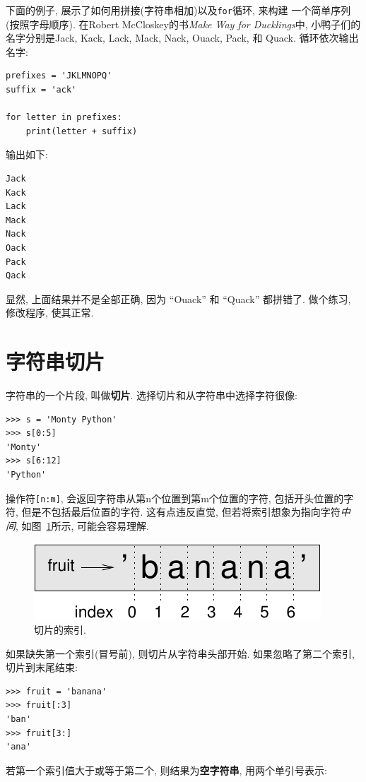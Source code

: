 \documentclass[10pt]{book}
\begin{document}
下面的例子, 展示了如何用拼接(字符串相加)以及{\tt for}循环, 来构建
一个简单序列(按照字母顺序). 
在Robert McCloskey的书{\em Make Way for Ducklings}中, 
小鸭子们的名字分别是Jack, Kack, Lack,
Mack, Nack, Ouack, Pack, 和 Quack.
循环依次输出名字:

\begin{verbatim}
prefixes = 'JKLMNOPQ'
suffix = 'ack'

for letter in prefixes:
    print(letter + suffix)
\end{verbatim}
%
输出如下:

\begin{verbatim}
Jack
Kack
Lack
Mack
Nack
Oack
Pack
Qack
\end{verbatim}
%
显然, 上面结果并不是全部正确, 因为 ``Ouack'' 和 ``Quack'' 都拼错了. 
做个练习, 修改程序, 使其正常. 



\section{字符串切片}
\label{slice}
  
 

字符串的一个片段, 叫做{\bf 切片}.
选择切片和从字符串中选择字符很像:

\begin{verbatim}
>>> s = 'Monty Python'
>>> s[0:5]
'Monty'
>>> s[6:12]
'Python'
\end{verbatim}
%
操作符{\tt [n:m]}, 会返回字符串从第n个位置到第m个位置的字符, 
包括开头位置的字符, 但是不包括最后位置的字符. 
这有点违反直觉, 但若将索引想象为指向字符{\em 中间}, 如图~\ref{fig.banana}所示,
可能会容易理解. 

\begin{figure}
\centerline
{\includegraphics[scale=0.8]{figs/banana.pdf}}
\caption{切片的索引.}
\label{fig.banana}
\end{figure}
如果缺失第一个索引(冒号前), 则切片从字符串头部开始. 
如果忽略了第二个索引, 切片到末尾结束:

\begin{verbatim}
>>> fruit = 'banana'
>>> fruit[:3]
'ban'
>>> fruit[3:]
'ana'
\end{verbatim}
%
若第一个索引值大于或等于第二个, 则结果为{\bf 空字符串}, 用两个单引号表示:
\end{document}
